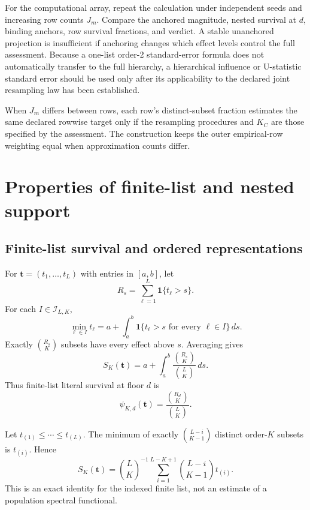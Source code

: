 \documentclass[11pt]{article}
\theoremstyle{remark}
\begin{document}
For the computational array, repeat the calculation under independent seeds
and increasing row counts $J_m$. Compare the anchored magnitude, nested
survival at $d$, binding anchors, row survival fractions, and verdict. A stable
unanchored projection is insufficient if anchoring changes which effect levels
control the full assessment. Because a one-list order-2 standard-error formula
does not automatically transfer to the full hierarchy, a hierarchical
influence or U-statistic standard error should be used only after its
applicability to the declared joint resampling law has been established.

When $J_m$ differs between rows, each row's distinct-subset fraction estimates
the same declared rowwise target only if the resampling procedures and $K_C$
are those specified by the assessment. The construction keeps the outer
empirical-row weighting equal when approximation counts differ.


\section{Properties of finite-list and nested support}
\label{app:support-proofs}

\subsection{Finite-list survival and ordered representations}

For $\mathbf t=(t_1,\ldots,t_L)$ with entries in $[a,b]$, let
\[
R_s=\sum_{\ell=1}^L\mathbf 1\{t_\ell>s\}.
\]
For each $I\in\mathcal I_{L,K}$,
\[
\min_{\ell\in I}t_\ell
=
a+\int_a^b
\mathbf 1\{t_\ell>s\text{ for every }\ell\in I\}\,ds.
\]
Exactly $\binom{R_s}{K}$ subsets have every effect above $s$. Averaging gives
\begin{equation}
S_K(\mathbf t)
=
a+\int_a^b
\frac{\binom{R_s}{K}}{\binom{L}{K}}\,ds.
\label{eq:finite-survival}
\end{equation}
Thus finite-list literal survival at floor $d$ is
\begin{equation}
\psi_{K,d}(\mathbf t)
=
\frac{\binom{R_d}{K}}{\binom{L}{K}}.
\label{eq:finite-literal}
\end{equation}

Let $t_{(1)}\leq\cdots\leq t_{(L)}$. The minimum of exactly
$\binom{L-i}{K-1}$ distinct order-$K$ subsets is $t_{(i)}$. Hence
\begin{equation}
S_K(\mathbf t)
=
\binom{L}{K}^{-1}
\sum_{i=1}^{L-K+1}
\binom{L-i}{K-1}t_{(i)}.
\label{eq:finite-ordered}
\end{equation}
This is an exact identity for the indexed finite list, not an estimate of a
population spectral functional.
\end{document}
